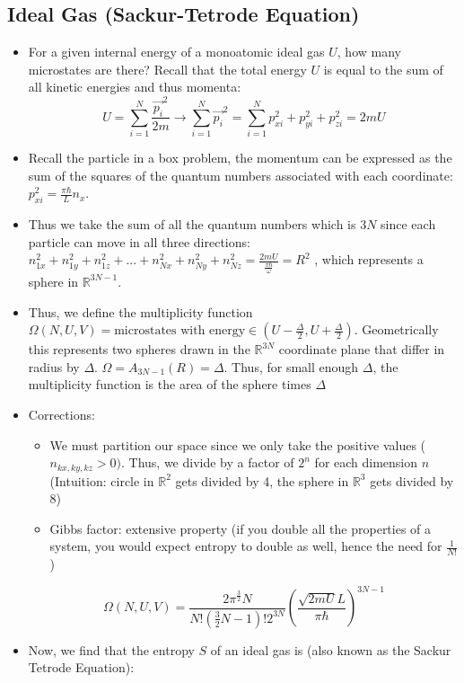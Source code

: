 \documentclass[8pt]{article}
\begin{document}
\subsection{Ideal Gas (Sackur-Tetrode Equation)}
\begin{itemize}
    \item For a given internal energy of a monoatomic ideal gas $U$, how many microstates are there? Recall that the total energy $U$ is equal to the sum of all kinetic energies and thus momenta: \[U = \sum_{i=1}^{N}\frac{\vec{p_i}^2}{2m} \rightarrow \sum_{i=1}^N \vec{p_i}^2  = \sum_{i=1}^N p^2_{xi} + p^2_{yi} + p^2_{zi} = 2mU \] 
    \item Recall the particle in a box problem, the momentum can be expressed as the sum of the squares of the quantum numbers associated with each coordinate: $p_{xi}^2 = \frac{\pi \hbar}{L} n_x$. 
    \item Thus we take the sum of all the quantum numbers which is $3N$ since each particle can move in all three directions: $n_{1x}^2 + n_{1y}^2 + n_{1z}^2 + ... + n_{Nx}^2 + n_{Ny}^2 + n_{Nz}^2 = \frac{2mU}{\frac{\pi \hbar}{\omega}} = R^2$  , which represents a sphere in $\mathbb{R}^{3N-1}$.
    \item Thus, we define the multiplicity function $\Omega(N, U,V) = \text{microstates with energy} \in (U - \frac{\Delta}{2}, U + \frac{\Delta}{2})$. Geometrically this represents two spheres drawn in the $\mathbb{R}^{3N}$ coordinate plane that differ in radius by $\Delta$. $\Omega = A_{3N-1}(R)= \Delta$. Thus, for small enough $\Delta$, the multiplicity function is the area of the sphere times $\Delta$
    \item Corrections: 
    \begin{itemize}
        \item We must partition our space since we only take the positive values ($n_{kx,ky,kz} > 0)$. Thus, we divide by a factor of $2^n$ for each dimension $n$ (Intuition: circle in $\mathbb{R}^2$ gets divided by 4, the sphere in $\mathbb{R}^3$ gets divided by 8)
        \item Gibbs factor: extensive property (if you double all the properties of a system, you would expect entropy to double as well, hence the need for $\frac{1}{N!}$)
    \end{itemize}
\[\Omega(N,U,V) = \frac{2\pi ^{\frac{3}{2}}N}{N! (\frac{3}{2}N-1)! 2^{3N}} \left( \frac{\sqrt{2mU}L}{\pi \hbar} \right)^{3N-1}\]
    \item Now, we find that the entropy $S$ of an ideal gas is (also known as the Sackur Tetrode Equation): 

\end{itemize}
\end{document}
